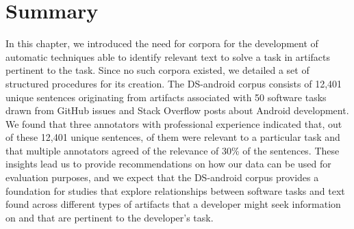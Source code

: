 
\section{Summary}
\label{cp4:corpus-summary}

In this chapter, we introduced the need for corpora 
for the development of 
automatic techniques able to identify relevant text
to solve a task in artifacts
pertinent to the task.
Since  no such corpora
existed, we detailed 
a set of structured procedures for its creation. 
The \acs{DS-android} corpus consists of  
12,401 unique sentences
originating from artifacts associated with 50 software tasks
drawn from GitHub issues and Stack Overflow posts about Android development. 
We found that 
three annotators with professional experience indicated that,
out of these 12,401 unique sentences, 
 of them were relevant to a particular task and that multiple annotators agreed of the relevance of 30\% of the sentences.
These insights lead us to provide recommendations on how our data can be used for evaluation purposes, and we expect that the \acs{DS-android} corpus
provides a foundation for studies that explore relationships between software tasks and text found across different types of artifacts that a developer might seek information on and that are pertinent to the developer's task.
 
